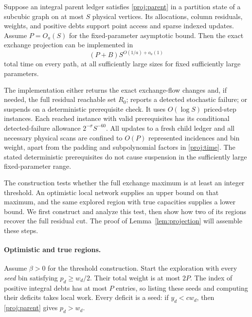 \begin{lemma}
\label{lem:projection}
Suppose an integral parent ledger satisfies
\eqref{proj:parent} in a partition state of a subcubic graph on at most
\(S\) physical vertices.  Its allocations, column residuals, weights,
and positive debts support point access and sparse indexed updates.
Assume \(P=O_a(S)\) for the fixed-parameter asymptotic bound.
Then the exact exchange projection can be implemented in
\begin{equation}
\label{proj:time}
                         (P+B)S^{O(1/a)+o_a(1)}
\end{equation}
total time on every path, at all sufficiently large sizes for fixed
sufficiently large parameters.

The implementation either returns the exact exchange-flow changes
and, if needed, the full residual reachable set \(R_0\); reports a
detected stochastic failure; or suspends on a deterministic
prerequisite check.  It uses \(O(\log S)\) priced-step instances.
Each reached instance with valid prerequisites has its conditional
detected-failure allowance \(2^{-\sigma}S^{-60}\).
All updates to a fresh child ledger and all necessary physical scans
are confined to \(O(P)\) represented incidences and bin weight, apart
from the padding and subpolynomial factors in \eqref{proj:time}.
The stated deterministic prerequisites do not cause suspension in
the sufficiently large fixed-parameter range.
\end{lemma}

The construction tests whether the full exchange maximum is at least
an integer threshold.  An optimistic local network supplies an upper
bound on that maximum, and the same explored region with true
capacities supplies a lower bound.  We first construct and analyze
this test, then show how two of its regions recover the full residual
cut.  The proof of Lemma~\ref{lem:projection} will assemble these steps.

\paragraph{Optimistic and true regions.}
Assume \(\beta>0\) for the threshold construction.  Start the
exploration with every \emph{seed} bin satisfying
\(p_d\ge w_d/2\).  Their total weight is at most \(2P\).
The index of positive integral debts has at most \(P\) entries, so
listing these seeds and computing their deficits takes local work.
Every deficit is a seed: if \(y_d<cw_d\), then
\eqref{proj:parent} gives \(p_d>w_d\).


